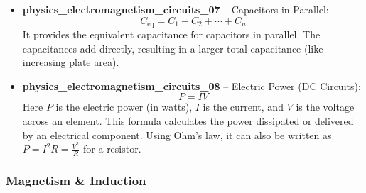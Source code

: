 \documentclass[11pt,a4paper]{article}
\begin{document}
\begin{itemize}
\item \textbf{physics\_electromagnetism\_circuits\_07} -- Capacitors in Parallel: 
\[C_{\text{eq}} = C_1 + C_2 + \cdots + C_n\]
It provides the equivalent capacitance for capacitors in parallel. The capacitances add directly, resulting in a larger total capacitance (like increasing plate area).

\item \textbf{physics\_electromagnetism\_circuits\_08} -- Electric Power (DC Circuits): 
\[P = IV\]
Here $P$ is the electric power (in watts), $I$ is the current, and $V$ is the voltage across an element. This formula calculates the power dissipated or delivered by an electrical component. Using Ohm's law, it can also be written as $P = I^2 R = \frac{V^2}{R}$ for a resistor.
\end{itemize}

\subsubsection{Magnetism \& Induction}
\end{document}
